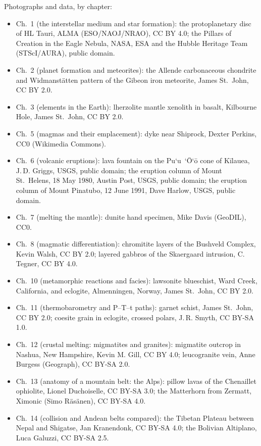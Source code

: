 \bigskip
\noindent Photographs and data, by chapter:
\begin{itemize}\small
  \item Ch.~1 (the interstellar medium and star formation): the protoplanetary disc of HL Tauri, ALMA (ESO/NAOJ/NRAO), CC BY 4.0; the Pillars of Creation in the Eagle Nebula, NASA, ESA and the Hubble Heritage Team (STScI/AURA), public domain.
  \item Ch.~2 (planet formation and meteorites): the Allende carbonaceous chondrite and Widmanstätten pattern of the Gibeon iron meteorite, James St.~John, CC BY 2.0.
  \item Ch.~3 (elements in the Earth): lherzolite mantle xenolith in basalt, Kilbourne Hole, James St.~John, CC BY 2.0.
  \item Ch.~5 (magmas and their emplacement): dyke near Shiprock, Dexter Perkins, CC0 (Wikimedia Commons).
  \item Ch.~6 (volcanic eruptions): lava fountain on the Pu`u~`\=O`\=o cone of Kīlauea, J.\,D. Griggs, USGS, public domain; the eruption column of Mount St.~Helens, 18 May 1980, Austin Post, USGS, public domain; the eruption column of Mount Pinatubo, 12 June 1991, Dave Harlow, USGS, public domain.
  \item Ch.~7 (melting the mantle): dunite hand specimen, Mike Davis (GeoDIL), CC0.
  \item Ch.~8 (magmatic differentiation): chromitite layers of the Bushveld Complex, Kevin Walsh, CC BY 2.0; layered gabbros of the Skaergaard intrusion, C. Tegner, CC BY 4.0.
  \item Ch.~10 (metamorphic reactions and facies): lawsonite blueschist, Ward Creek, California, and eclogite, Almenningen, Norway, James St.~John, CC BY 2.0.
  \item Ch.~11 (thermobarometry and P--T--t paths): garnet schist, James St.~John, CC BY 2.0; coesite grain in eclogite, crossed polars, J.\,R. Smyth, CC BY-SA 1.0.
  \item Ch.~12 (crustal melting: migmatites and granites): migmatite outcrop in Nashua, New Hampshire, Kevin M. Gill, CC BY 4.0; leucogranite vein, Anne Burgess (Geograph), CC BY-SA 2.0.
  \item Ch.~13 (anatomy of a mountain belt: the Alps): pillow lavas of the Chenaillet ophiolite, Lionel Duchoiselle, CC BY-SA 3.0; the Matterhorn from Zermatt, Ximonic (Simo Räsänen), CC BY-SA 4.0.
  \item Ch.~14 (collision and Andean belts compared): the Tibetan Plateau between Nepal and Shigatse, Jan Kranendonk, CC BY-SA 4.0; the Bolivian Altiplano, Luca Galuzzi, CC BY-SA 2.5.

\end{itemize}
